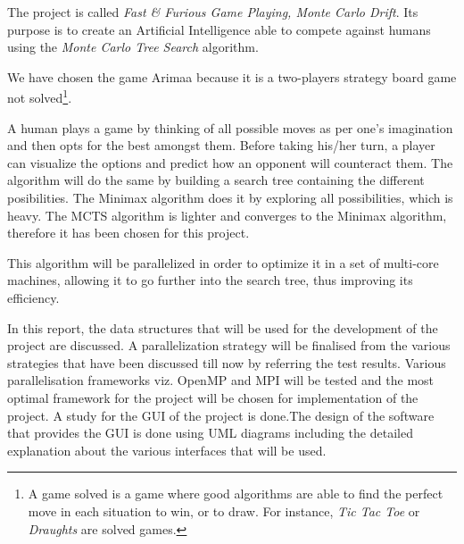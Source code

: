 The project is called \emph{Fast \& Furious Game Playing, Monte Carlo Drift}. Its purpose is to create an Artificial Intelligence able to compete against humans using the \emph{Monte Carlo Tree Search} algorithm.

We have chosen the game Arimaa because it is a two-players strategy board game not solved\footnote{A game solved is a game where good algorithms are able to find the perfect move in each situation to win, or to draw. For instance, \textit{Tic Tac Toe} or \textit{Draughts} are solved games.}.

A human plays a game by thinking of all possible moves as per one's imagination and then opts for the best amongst them. Before taking his/her turn, a player can visualize the options and predict how an opponent will counteract them. The algorithm will do the same by building a search tree containing the different posibilities. The Minimax algorithm does it by exploring all possibilities, which is heavy. The MCTS algorithm is lighter and converges to the Minimax algorithm, therefore it has been chosen for this project.

This algorithm will be parallelized in order to optimize it in a set of multi-core machines, allowing it to go further into the search tree, thus improving its efficiency.

In this report, the data structures that will be used for the development of the project are discussed.
A parallelization strategy will be finalised from the various strategies that have been discussed till now by referring the test results. Various parallelisation frameworks viz. OpenMP and MPI  will be tested and the most optimal framework for the project will be chosen for implementation of the project.
A study for the GUI of the project is done.The design of the software that provides the GUI is done using UML diagrams including the detailed explanation about the various interfaces that will be used.